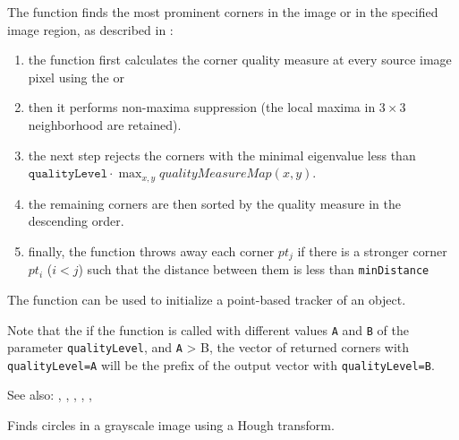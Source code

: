 The function finds the most prominent corners in the image or in the specified image region, as described
in \cite{Shi94}:
\begin{enumerate}
\item the function first calculates the corner quality measure at every source image pixel using the  or 
\item then it performs non-maxima suppression (the local maxima in $3\times 3$ neighborhood
are retained).
\item the next step rejects the corners with the minimal eigenvalue less than $\texttt{qualityLevel} \cdot \max_{x,y} qualityMeasureMap(x,y)$.
\item the remaining corners are then sorted by the quality measure in the descending order.
\item finally, the function throws away each corner $pt_j$ if there is a stronger corner $pt_i$ ($i < j$) such that the distance between them is less than \texttt{minDistance}
\end{enumerate}

The function can be used to initialize a point-based tracker of an object.

Note that the if the function is called with different values \texttt{A} and \texttt{B} of the parameter \texttt{qualityLevel}, and \texttt{A} > {B}, the vector of returned corners with \texttt{qualityLevel=A} will be the prefix of the output vector with \texttt{qualityLevel=B}.

See also: , , , , , 

Finds circles in a grayscale image using a Hough transform.

